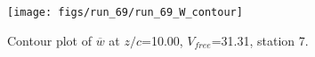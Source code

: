 \begin{figure}[H]
\centering
\texttt{[image: figs/run\_69/run\_69\_W\_contour]}
\caption{Contour plot of $\overline{w}$ at $z/c$=10.00, $V_{free}$=31.31, station 7.}
\end{figure}


